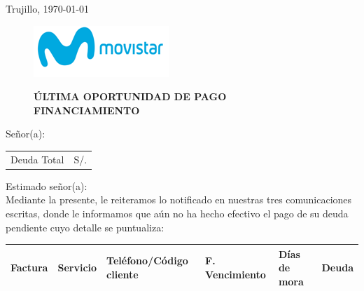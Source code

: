 %
%

\begin{flushright}
    Trujillo, \today
\end{flushright}
\vspace{-0.5cm}

\begin{figure}[h]
\begin{minipage}[b]{5.106458333cm}
\includegraphics[natwidth=5.106458333cm, natheight=1.931458333cm]{resources/business_logo.png}
\end{minipage}
\begin{minipage}[b][1.9314cm][t]{11cm}
\begin{flushright}
{\LARGE \bf ÚLTIMA OPORTUNIDAD DE PAGO\\FINANCIAMIENTO}
\end{flushright}
\end{minipage}
\end{figure}

\noindent
Señor(a):\\

\begin{flushright}
\bf \large
\begin{tabular}{|p{3.2cm} p{3.2cm}|}
\hline
Deuda Total & S/. %
\hline
\end{tabular}
\end{flushright}

\noindent
Estimado señor(a):\\
Mediante la presente, le reiteramos lo notificado en nuestras tres comunicaciones escritas, donde le informamos que aún no ha hecho efectivo el pago de su deuda pendiente cuyo detalle se puntualiza:

\begin{center}
\scriptsize
\begin{tabular}{|x{1.2cm}|x{2cm}|x{3.5cm}|x{2.5cm}|x{2cm}|x{2cm}|}
\hline
\textbf{Factura} & \textbf{Servicio} & \textbf{Teléfono/Código cliente} & \textbf{F. Vencimiento} & \textbf{Días de mora} & \textbf{Deuda} \\
\hline
\hline
\end{tabular}
\end{center}

